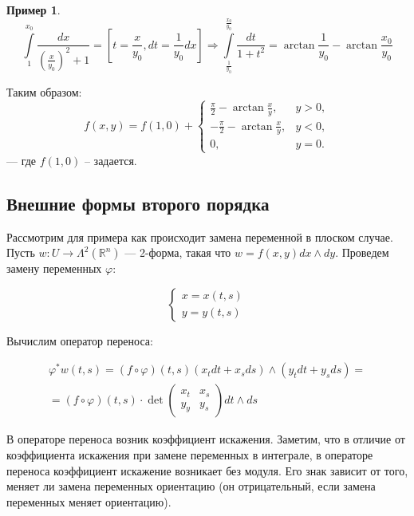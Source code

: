 \documentclass[a5paper]{article}
\newcounter{through}
\theoremstyle{plain}
\theoremstyle{definition}
\newtheorem{example}[through]{Пример}
\numberwithin{through}{section}
\numberwithin{equation}{section}
\begin{document}
\begin{example}
	\begin{equation*}
		\int\limits_1^{x_0} \frac{dx}{\left(\frac{x}{y_0}\right)^2 + 1} = \left[ t = \frac{x}{y_0}, dt = \frac{1}{y_0}dx \right]
		\Rightarrow \int\limits_{\frac{1}{y_0}}^{\frac{x_0}{y_0}} \frac{dt}{1 + t^2} = \arctan \frac{1}{y_0} - \arctan \frac{x_0}{y_0}
	\end{equation*}
	
	Таким образом:
	\begin{equation*}
		f(x, y) = f(1, 0) +
		 \begin{cases}
		\frac{\pi}{2} - \arctan \frac{x}{y}, & y > 0,\\
		- \frac{\pi}{2} - \arctan \frac{x}{y}, & y < 0,\\
		0, & y = 0.
		\end{cases}
	\end{equation*}
	--- где $f(1, 0)$ -- задается.
\end{example}

\subsection{Внешние формы второго порядка} %

Рассмотрим для примера как происходит замена переменной в плоском случае. Пусть $w : U \to \Lambda^2(\mathbb{R}^n)$ --- 2-форма, такая что $w=f(x,y) dx \wedge dy$. Проведем замену переменных $\varphi$:

\begin{equation*}
	\begin{cases}
		x = x(t, s) \\
		y = y(t, s)
	\end{cases}
\end{equation*}

Вычислим оператор переноса:

\begin{multline*}
	\varphi^{*} w(t, s) = (f \circ \varphi) (t, s) (x_t dt + x_s ds) \wedge (y_t dt + y_s ds) = \\ = (f \circ \varphi) (t, s) \cdot \det 
	\begin{pmatrix}
		x_t & x_s \\
		y_y & y_s
	\end{pmatrix} dt \wedge ds
\end{multline*}

В операторе переноса возник коэффициент искажения. Заметим, что в отличие от коэффициента искажения при замене переменных в интеграле, в операторе переноса коэффициент искажение возникает без модуля. Его знак зависит от того, меняет ли замена переменных ориентацию (он отрицательный, если замена переменных меняет ориентацию).
\end{document}

